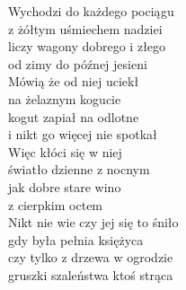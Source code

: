 
Wychodzi do każdego pociągu \tab{}  \\
z żółtym uśmiechem nadziei \tab{}  \\
liczy wagony dobrego i złego \tab{} \\
od zimy do późnej jesieni \tab{} \\
\hops
Mówią że od niej uciekł  \\
na żelaznym kogucie  \\
kogut zapiał na odlotne  \\
i nikt go więcej nie spotkał  \\
\hops
Więc kłóci się w niej  \\
światło dzienne z nocnym  \\
jak dobre stare wino  \\
z cierpkim octem  \\
\hops
Nikt nie wie czy jej się to śniło  \\
gdy była pełnia księżyca  \\
czy tylko z drzewa w ogrodzie  \\
gruszki szaleństwa ktoś strąca